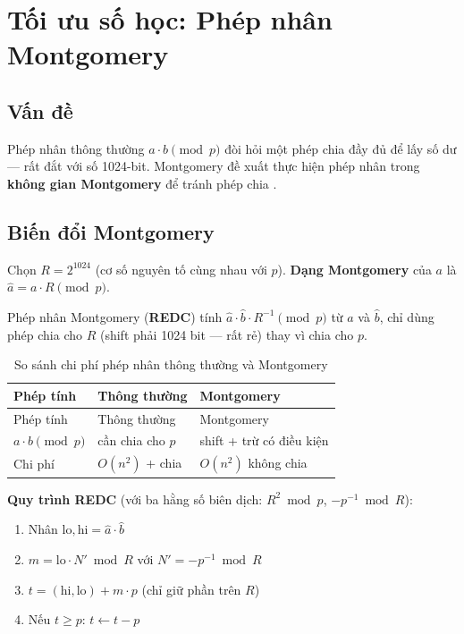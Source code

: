 \section{Tối ưu số học: Phép nhân
Montgomery}\label{tux1ed1i-ux1b0u-sux1ed1-hux1ecdc-phuxe9p-nhuxe2n-montgomery}

\subsection{Vấn đề}\label{vux1ea5n-ux111ux1ec1}

Phép nhân thông thường \(a \cdot b \pmod{p}\) đòi hỏi một phép chia đầy
đủ để lấy số dư --- rất đắt với số 1024-bit. Montgomery đề xuất thực
hiện phép nhân trong \textbf{không gian Montgomery} để tránh phép chia
\citep{Montgomery1985}.

\subsection{Biến đổi
Montgomery}\label{biux1ebfn-ux111ux1ed5i-montgomery}

Chọn \(R = 2^{1024}\) (cơ số nguyên tố cùng nhau với \(p\)).
\textbf{Dạng Montgomery} của \(a\) là \(\hat{a} = a \cdot R \pmod{p}\).

Phép nhân Montgomery (\textbf{REDC}) tính
\(\hat{a} \cdot \hat{b} \cdot R^{-1} \pmod{p}\) từ \(\hat{a}\) và
\(\hat{b}\), chỉ dùng phép chia cho \(R\) (shift phải 1024 bit --- rất
rẻ) thay vì chia cho \(p\).

\begin{longtable}[]{@{}lll@{}}
\caption{So sánh chi phí phép nhân thông thường và
Montgomery}\tabularnewline
\toprule\noalign{}
Phép tính & Thông thường & Montgomery \\
\midrule\noalign{}
\endfirsthead
\toprule\noalign{}
Phép tính & Thông thường & Montgomery \\
\midrule\noalign{}
\endhead
\bottomrule\noalign{}
\endlastfoot
\(a \cdot b \pmod{p}\) & cần chia cho \(p\) & shift + trừ có điều
kiện \\
Chi phí & \(O(n^2)\) + chia & \(O(n^2)\) không chia \\
\end{longtable}

\textbf{Quy trình REDC} (với ba hằng số biên dịch: \(R^2 \bmod p\),
\(-p^{-1} \bmod R\)):

\begin{enumerate}
\def\labelenumi{\arabic{enumi}.}
\tightlist
\item
  Nhân \(\text{lo}, \text{hi} = \hat{a} \cdot \hat{b}\)
\item
  \(m = \text{lo} \cdot N' \bmod R\) với \(N' = -p^{-1} \bmod R\)
\item
  \(t = (\text{hi}, \text{lo}) + m \cdot p\) (chỉ giữ phần trên \(R\))
\item
  Nếu \(t \geq p\): \(t \leftarrow t - p\)
\end{enumerate}

